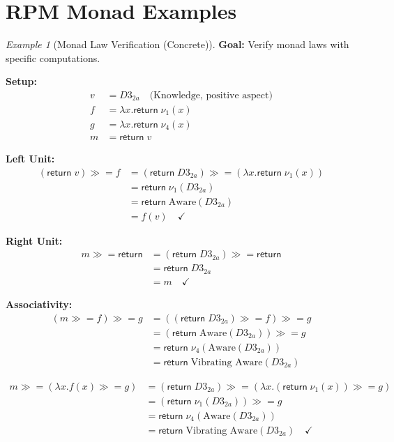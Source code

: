 \documentclass[11pt,twoside,openright]{book}
\theoremstyle{definition}
\theoremstyle{plain}
\theoremstyle{remark}
\newtheorem{example}[definition]{Example}
\newcommand{\noe}[1]{\nu_{#1}}
\newcommand{\rpmret}{\mathsf{return}}
\newcommand{\rpmbind}{\mathbin{\gg\!=}}
\begin{document}
\section{RPM Monad Examples}

\begin{example}[Monad Law Verification (Concrete)]
\label{ex:monad-laws-concrete}
\textbf{Goal:} Verify monad laws with specific computations.

\textbf{Setup:}
\begin{align}
v &= D3_{2a} \quad \text{(Knowledge, positive aspect)} \\
f &= \lambda x. \rpmret\; \noe{1}(x) \\
g &= \lambda x. \rpmret\; \noe{4}(x) \\
m &= \rpmret\; v
\end{align}

\textbf{Left Unit:}
\begin{align}
(\rpmret\; v) \rpmbind f &= (\rpmret\; D3_{2a}) \rpmbind (\lambda x. \rpmret\; \noe{1}(x)) \\
&= \rpmret\; \noe{1}(D3_{2a}) \\
&= \rpmret\; \text{Aware}(D3_{2a}) \\
&= f(v) \quad \checkmark
\end{align}

\textbf{Right Unit:}
\begin{align}
m \rpmbind \rpmret &= (\rpmret\; D3_{2a}) \rpmbind \rpmret \\
&= \rpmret\; D3_{2a} \\
&= m \quad \checkmark
\end{align}

\textbf{Associativity:}
\begin{align}
(m \rpmbind f) \rpmbind g &= ((\rpmret\; D3_{2a}) \rpmbind f) \rpmbind g \\
&= (\rpmret\; \text{Aware}(D3_{2a})) \rpmbind g \\
&= \rpmret\; \noe{4}(\text{Aware}(D3_{2a})) \\
&= \rpmret\; \text{Vibrating Aware}(D3_{2a})
\end{align}

\begin{align}
m \rpmbind (\lambda x. f(x) \rpmbind g) &= (\rpmret\; D3_{2a}) \rpmbind (\lambda x. (\rpmret\; \noe{1}(x)) \rpmbind g) \\
&= (\rpmret\; \noe{1}(D3_{2a})) \rpmbind g \\
&= \rpmret\; \noe{4}(\text{Aware}(D3_{2a})) \\
&= \rpmret\; \text{Vibrating Aware}(D3_{2a}) \quad \checkmark
\end{align}
\end{example}
\end{document}
